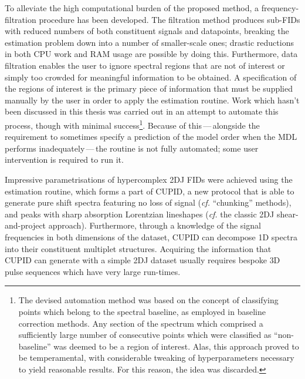 To alleviate the high computational burden of the proposed method,
a frequency-filtration procedure has been developed. The filtration method
produces sub-\acp{FID} with reduced numbers of both constituent signals and datapoints,
breaking the estimation problem down into a number of smaller-scale ones;
drastic reductions in both \ac{CPU} work and \ac{RAM} usage are possible by
doing this.
Furthermore, data filtration enables the user to ignore spectral regions
that are not of interest or simply too crowded for meaningful information to be
obtained. A specification of the regions of interest is the primary
piece of information that must be supplied manually by the user in order to
apply the estimation routine.
Work which hasn't been discussed in this thesis was carried out in an attempt to
automate this process, though with minimal success\footnote{
    The devised automation method was based on the concept of classifying
    points which belong to the spectral baseline, as employed in baseline
    correction methods\cite{Dietrich1991}. Any section of the spectrum which
    comprised a sufficiently large number of consecutive points which were
    classified as ``non-baseline'' was deemed to be a region of interest. Alas,
    this approach proved to be temperamental, with considerable tweaking
    of hyperparameters necessary to yield reasonable results. For this reason,
    the idea was discarded.
}. Because of this\,---\,alongside the requirement to sometimes specify a
prediction of the model order when the \ac{MDL} performs inadequately\,---\,the
routine is not fully automated; some user intervention is required to run it.

Impressive parametrisations of hypercomplex \ac{2DJ} \acp{FID} were achieved using
the estimation routine, which forms a part of \ac{CUPID}, a new protocol that
is able to generate pure shift spectra featuring no loss of signal (\textit{cf.}
``chunking'' methods), and peaks with sharp absorption Lorentzian lineshapes
(\textit{cf.} the classic \ac{2DJ} shear-and-project approach).
Furthermore, through a knowledge of the signal frequencies in both dimensions
of the dataset, \ac{CUPID} can decompose \ac{1D} spectra into their constituent
multiplet structures. Acquiring the information that \ac{CUPID} can generate
with a simple \ac{2DJ} dataset usually requires bespoke \ac{3D} pulse sequences
which have very large run-times.

